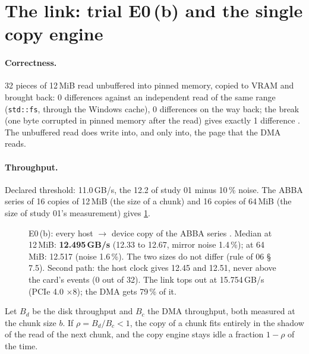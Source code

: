 \section{The link: trial E0\,(b) and the single copy engine}\label{sec:t2c-dma}

\paragraph{Correctness.} 32 pieces of 12\,MiB read unbuffered into pinned memory, copied to VRAM and brought back: 0 differences against an independent read of the same range (\texttt{std::fs}, through the Windows cache), 0 differences on the way back; the break (one byte corrupted in pinned memory after the read) gives exactly 1 difference \mes. The unbuffered read does write into, and only into, the page that the DMA reads.

\paragraph{Throughput.} Declared threshold: 11.0\,GB/s, the 12.2 of study 01 minus 10\,\% noise. The ABBA series of 16 copies of 12\,MiB (the size of a chunk) and 16 copies of 64\,MiB (the size of study 01's measurement) gives \cref{fig:t2c-dma}.

\begin{figure}[ht]
\centering
\GrapheChmDma
\caption[E0\,(b): DMA from pinned memory]{E0\,(b): every host $\to$ device copy of the ABBA series \mes. Median at 12\,MiB: \textbf{12.495\,GB/s} (12.33 to 12.67, mirror noise 1.4\,\%); at 64\,MiB: 12.517 (noise 1.6\,\%). The two sizes do not differ (rule of 06 § 7.5). Second path: the host clock gives 12.45 and 12.51, never above the card's events (0 out of 32). The link tops out at 15.754\,GB/s (PCIe 4.0 $\times$8); the DMA gets 79\,\% of it.}
\label{fig:t2c-dma}
\end{figure}

\begin{proposition}\label{prop:t2c-pcie}
Let $B_d$ be the disk throughput and $B_c$ the DMA throughput, both measured at the chunk size $b$. If $\rho = B_d / B_c < 1$, the copy of a chunk fits entirely in the shadow of the read of the next chunk, and the copy engine stays idle a fraction $1 - \rho$ of the time.
\end{proposition}

